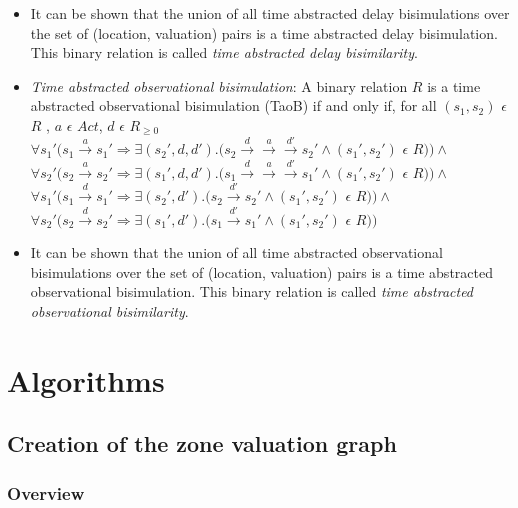 \documentclass{article}
\begin{document}
\begin{itemize}
\item It can be shown that the union of all time abstracted delay
  bisimulations over the set of (location, valuation) pairs is a
  time abstracted delay bisimulation. This binary relation is called
  \textit{time abstracted delay bisimilarity}.

\item \emph{Time abstracted observational bisimulation}: A binary relation
  $R$ is a time abstracted observational bisimulation (TaoB) if and only if, for all
  $(s_1, s_2)$ $\epsilon$ $R$ , $a$ $\epsilon$ $Act $, $d$ $\epsilon$ $R_{\ge 0}$\\
  $\forall s_1' (s_1 \xrightarrow{a} s_1' \Rightarrow \exists (s_2',
  d, d') . (s_2 \xrightarrow{d} \xrightarrow{a} \xrightarrow{d'} s_2'
  \wedge (s_1', s_2')$ $\epsilon$ $R ) ) \wedge $ \\
  $\forall s_2' (s_2 \xrightarrow{a} s_2' \Rightarrow \exists (s_1',
  d, d') . (s_1 \xrightarrow{d} \xrightarrow{a} \xrightarrow{d'} s_1'
  \wedge (s_1', s_2')$ $\epsilon$ $R ) ) \wedge $ \\
  $\forall s_1' (s_1 \xrightarrow{d} s_1' \Rightarrow \exists (s_2',
  d')
  . (s_2 \xrightarrow{d'} s_2' \wedge (s_1', s_2')$ $\epsilon$ $R ) )
  \wedge $ \\
  $\forall s_2' (s_2 \xrightarrow{d} s_2' \Rightarrow \exists (s_1', d')
  . (s_1 \xrightarrow{d'} s_1' \wedge (s_1', s_2')$ $\epsilon$ $R ) ) $ \\

\item It can be shown that the union of all time abstracted observational
  bisimulations over the set of (location, valuation) pairs is a
  time abstracted observational bisimulation. This binary relation is called
  \textit{time abstracted observational bisimilarity}.

\end{itemize}

\section{Algorithms}

\subsection{Creation of the zone valuation graph}

\subsubsection{Overview}
\end{document}

